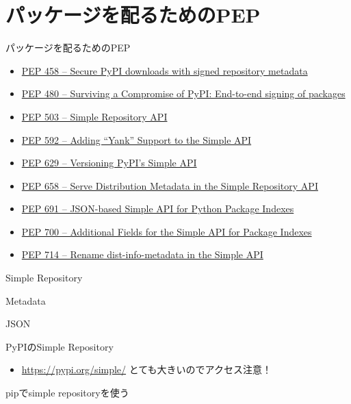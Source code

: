 \documentclass[presentation]{beamer}
\begin{document}
\section{パッケージを配るためのPEP}
\label{sec:org9e96798}
\begin{frame}[label={sec:org1980494}]{パッケージを配るためのPEP}
\begin{itemize}
\item \href{https://peps.python.org/pep-0458}{PEP 458 – Secure PyPI downloads with signed repository metadata}
\item \href{https://peps.python.org/pep-0480}{PEP 480 – Surviving a Compromise of PyPI: End-to-end signing of packages}
\item \href{https://peps.python.org/pep-0503/}{PEP 503 – Simple Repository API}
\item \href{https://peps.python.org/pep-0592}{PEP 592 – Adding “Yank” Support to the Simple API}
\item \href{https://peps.python.org/pep-0629}{PEP 629 – Versioning PyPI’s Simple API}
\item \href{https://peps.python.org/pep-0658}{PEP 658 – Serve Distribution Metadata in the Simple Repository API}
\item \href{https://peps.python.org/pep-0691}{PEP 691 – JSON-based Simple API for Python Package Indexes}
\item \href{https://peps.python.org/pep-0700}{PEP 700 – Additional Fields for the Simple API for Package Indexes}
\item \href{https://peps.python.org/pep-0714}{PEP 714 – Rename dist-info-metadata in the Simple API}
\end{itemize}
\end{frame}
\begin{frame}[label={sec:org51737c5}]{Simple Repository}
\end{frame}
\begin{frame}[label={sec:orgfbf046e}]{Metadata}
\end{frame}
\begin{frame}[label={sec:orge616ef8}]{JSON}
\end{frame}
\begin{frame}[label={sec:orgdcdf91d}]{PyPIのSimple Repository}
\begin{itemize}
\item \url{https://pypi.org/simple/} とても大きいのでアクセス注意！
\end{itemize}
\end{frame}
\begin{frame}[label={sec:org9b4c287}]{pipでsimple repositoryを使う}
\end{frame}
\end{document}
